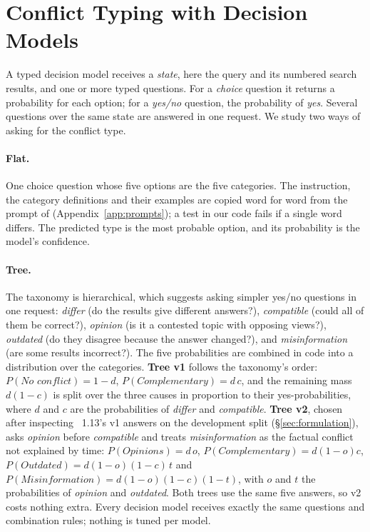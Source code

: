 \section{Conflict Typing with Decision Models}
\label{sec:method}

A typed decision model receives a \emph{state}, here the query and its numbered search results, and one or more
typed questions. For a \emph{choice} question it returns a probability for each option; for a \emph{yes/no}
question, the probability of \emph{yes}. Several questions over the same state are answered in one request. We
study two ways of asking for the conflict type.

\paragraph{Flat.} One choice question whose five options are the five categories. The instruction, the category
definitions and their examples are copied word for word from the prompt of \citet{cattan2025dragged}
(Appendix~\ref{app:prompts}); a test in our code fails if a single word differs. The predicted type is the
most probable option, and its probability is the model's confidence.

\paragraph{Tree.} The taxonomy is hierarchical, which suggests asking simpler yes/no questions in one request:
\emph{differ} (do the results give different answers?), \emph{compatible} (could all of them be correct?),
\emph{opinion} (is it a contested topic with opposing views?), \emph{outdated} (do they disagree because the answer
changed?), and \emph{misinformation} (are some results incorrect?). The five probabilities are combined in code into
a distribution over the categories. \textbf{Tree v1} follows the taxonomy's order: $P(\textit{No conflict}) =
1-d$, $P(\textit{Complementary}) = d\,c$, and the remaining mass $d(1-c)$ is split over the three causes in
proportion to their yes-probabilities, where $d$ and $c$ are the probabilities of \emph{differ} and
\emph{compatible}. \textbf{Tree v2}, chosen after inspecting \jev~1.13's v1 answers on the development split (\S\ref{sec:formulation}),
asks \emph{opinion} before \emph{compatible} and treats \emph{misinformation} as the factual conflict not explained
by time: $P(\textit{Opinions}) = d\,o$, $P(\textit{Complementary}) = d(1-o)c$, $P(\textit{Outdated}) =
d(1-o)(1-c)\,t$ and $P(\textit{Misinformation}) = d(1-o)(1-c)(1-t)$, with $o$ and $t$ the probabilities of
\emph{opinion} and \emph{outdated}. Both trees use the same five answers, so v2 costs nothing extra. Every decision model receives exactly the same
questions and combination rules; nothing is tuned per model.


